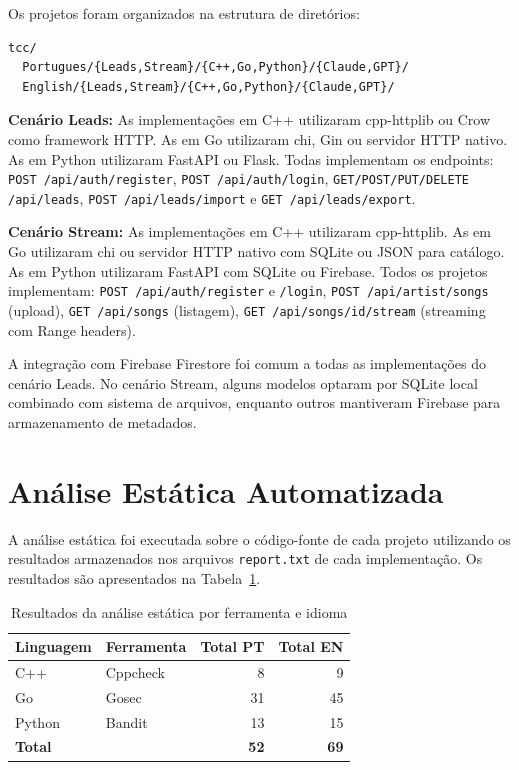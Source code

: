 \documentclass[12pt]{article}
\begin{document}
Os projetos foram organizados na estrutura de diretórios:
\begin{verbatim}
tcc/
  Portugues/{Leads,Stream}/{C++,Go,Python}/{Claude,GPT}/
  English/{Leads,Stream}/{C++,Go,Python}/{Claude,GPT}/
\end{verbatim}

\textbf{Cenário Leads:} As implementações em C++ utilizaram cpp-httplib ou Crow como framework HTTP. As em Go utilizaram chi, Gin ou servidor HTTP nativo. As em Python utilizaram FastAPI ou Flask. Todas implementam os endpoints: \texttt{POST /api/auth/register}, \texttt{POST /api/auth/login}, \texttt{GET/POST/PUT/DELETE /api/leads}, \texttt{POST /api/leads/import} e \texttt{GET /api/leads/export}.

\textbf{Cenário Stream:} As implementações em C++ utilizaram cpp-httplib. As em Go utilizaram chi ou servidor HTTP nativo com SQLite ou JSON para catálogo. As em Python utilizaram FastAPI com SQLite ou Firebase. Todos os projetos implementam: \texttt{POST /api/auth/register} e \texttt{/login}, \texttt{POST /api/artist/songs} (upload), \texttt{GET /api/songs} (listagem), \texttt{GET /api/songs/{id}/stream} (streaming com Range headers).

A integração com Firebase Firestore foi comum a todas as implementações do cenário Leads. No cenário Stream, alguns modelos optaram por SQLite local combinado com sistema de arquivos, enquanto outros mantiveram Firebase para armazenamento de metadados.

\section{Análise Estática Automatizada}
\label{sec:estatica}

A análise estática foi executada sobre o código-fonte de cada projeto utilizando os resultados armazenados nos arquivos \texttt{report.txt} de cada implementação. Os resultados são apresentados na Tabela~\ref{tab:estatica}.

\begin{table}[H]
\centering
\caption{Resultados da análise estática por ferramenta e idioma}
\label{tab:estatica}
\begin{tabular}{llrr}
\toprule
\textbf{Linguagem} & \textbf{Ferramenta} & \textbf{Total PT} & \textbf{Total EN} \\
\midrule
C++ & Cppcheck & 8 & 9 \\
Go & Gosec & 31 & 45 \\
Python & Bandit & 13 & 15 \\
\midrule
\textbf{Total} & & \textbf{52} & \textbf{69} \\
\bottomrule
\end{tabular}
\end{table}
\end{document}
